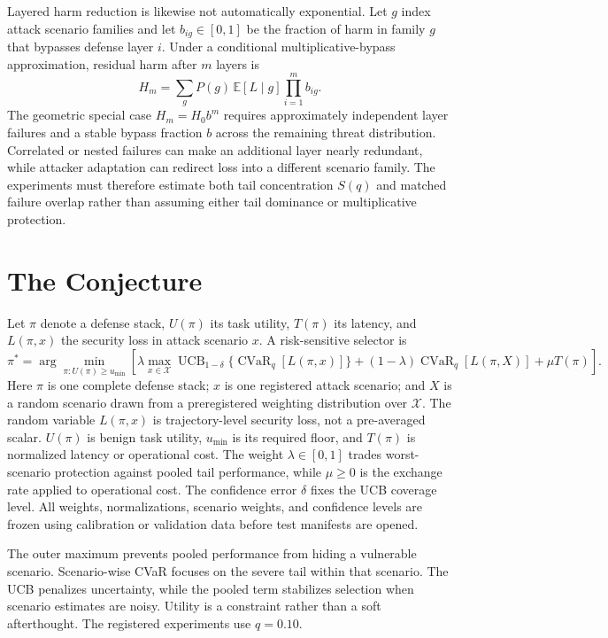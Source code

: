 \documentclass[10pt]{article}
\newcommand{\cvar}{\operatorname{CVaR}}
\newcommand{\ucb}{\operatorname{UCB}}
\begin{document}
Layered harm reduction is likewise not automatically exponential. Let $g$ index attack scenario families and let $b_{ig}\in[0,1]$ be the fraction of harm in family $g$ that bypasses defense layer $i$. Under a conditional multiplicative-bypass approximation, residual harm after $m$ layers is
\begin{equation}
H_m=\sum_g P(g)\,\mathbb{E}[L\mid g]\prod_{i=1}^{m}b_{ig}.
\label{eq:layeredharm}
\end{equation}
The geometric special case $H_m=H_0b^m$ requires approximately independent layer failures and a stable bypass fraction $b$ across the remaining threat distribution. Correlated or nested failures can make an additional layer nearly redundant, while attacker adaptation can redirect loss into a different scenario family. The experiments must therefore estimate both tail concentration $S(q)$ and matched failure overlap rather than assuming either tail dominance or multiplicative protection.

\section{The Conjecture}
Let $\pi$ denote a defense stack, $U(\pi)$ its task utility, $T(\pi)$ its latency, and $L(\pi,x)$ the security loss in attack scenario $x$. A risk-sensitive selector is
\begin{equation}
\pi^*=\arg\min_{\pi:U(\pi)\ge u_{\min}}
\left[
\lambda\max_{x\in\mathcal{X}}\ucb_{1-\delta}\{\cvar_q[L(\pi,x)]\}
+(1-\lambda)\cvar_q[L(\pi,X)]
+\mu T(\pi)
\right].
\label{eq:selector}
\end{equation}
Here $\pi$ is one complete defense stack; $x$ is one registered attack scenario; and $X$ is a random scenario drawn from a preregistered weighting distribution over $\mathcal{X}$. The random variable $L(\pi,x)$ is trajectory-level security loss, not a pre-averaged scalar. $U(\pi)$ is benign task utility, $u_{\min}$ is its required floor, and $T(\pi)$ is normalized latency or operational cost. The weight $\lambda\in[0,1]$ trades worst-scenario protection against pooled tail performance, while $\mu\geq0$ is the exchange rate applied to operational cost. The confidence error $\delta$ fixes the UCB coverage level. All weights, normalizations, scenario weights, and confidence levels are frozen using calibration or validation data before test manifests are opened.

The outer maximum prevents pooled performance from hiding a vulnerable scenario. Scenario-wise CVaR focuses on the severe tail within that scenario. The UCB penalizes uncertainty, while the pooled term stabilizes selection when scenario estimates are noisy. Utility is a constraint rather than a soft afterthought. The registered experiments use $q=0.10$.
\end{document}
